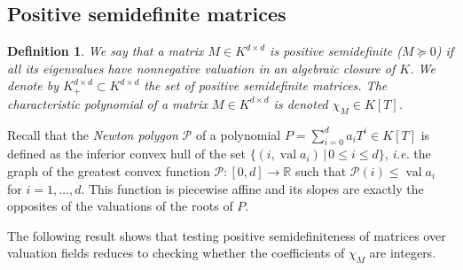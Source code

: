 \documentclass[a4paper,12pt]{article}
\newtheorem{definition}[theorem]{Definition}
\newcommand{\R}{\mathbb{R}} %
\DeclareMathOperator{\val}{val}
\begin{document}
\subsection{Positive semidefinite matrices}
\newcommand\Mat{Positive semidefinite matrix }
\newcommand\mats{positive semidefinite matrices }
\newcommand\Mats{positive semidefinite matrices }

\begin{definition}
  We say that a matrix $M \in K^{d \times d}$ is \emph{positive semidefinite} ($M \succeq 0$)
  if all its eigenvalues have nonnegative valuation in an algebraic closure of $K$.
  We denote by $K^{d \times d}_+ \subset K^{d\times d}$ the set of positive semidefinite matrices.
  The characteristic polynomial of a matrix $M \in K^{d\times d}$ is denoted $\chi_M \in K[T]$.
\end{definition}

Recall that the \emph{Newton polygon} $\mathcal{P}$ of a polynomial $P = \sum_{i=0}^{d} a_i T^i \in K[T]$ is
defined as the inferior convex hull of the set $\{(i, \val a_i) \,|\, 0 \le i \le d\}$, {\it i.e.} the
graph of the greatest convex function $\mathcal{P} : [0,d] \to \R$ such that $\mathcal{P}(i) \leq \val a_i$
for $i=1,\ldots,d$. This function is piecewise affine and its slopes are exactly the opposites of the valuations
of the roots of $P$.

The following result shows that testing positive semidefiniteness of matrices over
valuation fields reduces to checking whether the coefficients of $\chi_M$ are integers.
\end{document}
